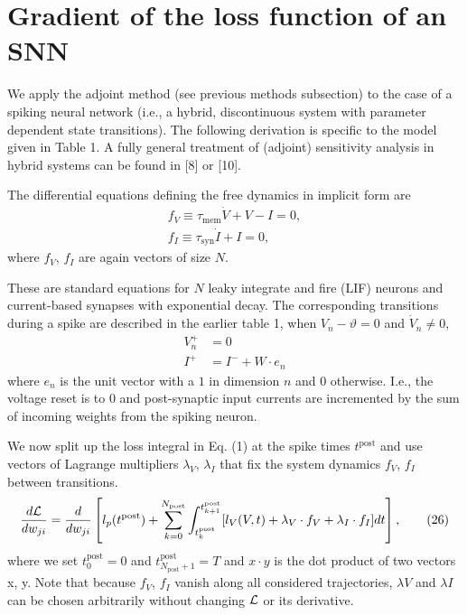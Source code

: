 \documentclass[a4paper]{article}
\newcommand{\blue}[1]{{\color{blue}#1}}
\begin{document}
\section{Gradient of the loss function of an SNN}

\blue{We apply the adjoint method (see previous methods subsection) to
  the case of a  spiking neural network (i.e., a hybrid, discontinuous
  system with parameter dependent state transitions). The  following
  derivation is specific to the model given in Table 1. A fully
  general treatment of (adjoint) sensitivity analysis in hybrid
  systems can be found in [8] or [10].

The differential equations defining the free dynamics in implicit form are
\begin{align}
  f_V \equiv \tau_{\text{mem}} \dot{V} + V - I = 0, \tag{25a} \\
  f_I \equiv \tau_{\text{syn}} \dot{I} + I = 0, \tag{25b}
\end{align}
where $f_V$, $f_I$ are again vectors of size $N$.
}

These are standard equations for $N$ leaky integrate and fire (LIF)
neurons and current-based synapses with exponential decay. The
corresponding transitions during a spike are described in the earlier
table 1, when $V_n - \vartheta = 0$ and $\dot{V}_n \neq 0$,
\begin{align}
  V^+_n &= 0 \label{eq:jumpV} \\
  I^+ &= I^- + W \cdot e_n \label{eq:jumpI}
\end{align}
where $e_n$ is the unit vector with a $1$ in dimension $n$ and $0$
otherwise. I.e., the voltage reset is to $0$ and post-synaptic input
currents are incremented by the sum of incoming weights from the
spiking neuron.

\blue{
  We now split up the loss integral in Eq. (1) at the spike times
  $t^{\text{post}}$ and use vectors of Lagrange multipliers
    $\lambda_V$, $\lambda_I$ that fix the system dynamics $f_V$, $f_I$
    between transitions. 
    \begin{align}
      \frac{d \cal L}{d w_{ji}} = \frac{d}{d w_{ji}} \left[
        l_p (t^{\text{post}}) + \sum_{k=0}^{N_{\text{post}}}
        \int_{t_k^{\text{post}}}^{t_{k+1}^{\text{post}}} [l_V(V,t) +
          \lambda_V \cdot f_V + \lambda_I \cdot f_I ] dt \right], \tag{26}
    \end{align}    
    where we set $t_0^{\text{post}} = 0$ and
    $t_{N_{\text{post}}+1}^{\text{post}} = T$ and $x \cdot y$ is the
    dot product of two vectors x, y. Note that because $f_V$, $f_I$ 
 vanish along all considered trajectories, $\lambda V$ and $\lambda I$
 can be chosen arbitrarily without changing $\cal L$ or its derivative. 
}
\end{document}
